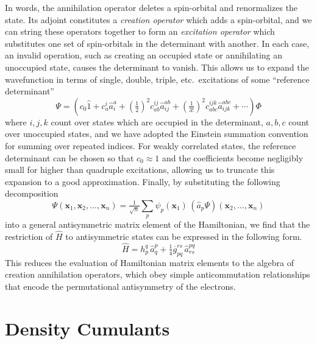 In words, the annihilation operator deletes a spin-orbital and renormalizes the
state.
Its adjoint constitutes a {\itshape creation operator} which adds a
spin-orbital, and we can string these operators together to form an {\itshape
excitation operator} which substitutes one set of spin-orbitals in the
determinant with another.
In each case, an invalid operation, such as creating an occupied state or
annihilating an unoccupied state, causes the determinant to vanish.
This allows us to expand the wavefunction in terms of single, double, triple,
etc.\ excitations of some ``reference determinant''
\begin{equation}
    \label{eq:intro-ci-expansion}
    \Psi
    =
    \left(
        c_0
        \hat{1}
        +
        c_a^i
        \hat{a}^a_i
        +
        (\tfrac{1}{2})^2
        c_{ab}^{ij}
        \hat{a}^{ab}_{ij}
        +
        (\tfrac{1}{3!})^2
        c_{abc}^{ijk}
        \hat{a}^{abc}_{ijk}
        +
        \cdots
    \right)
    \Phi
\end{equation}
where \(i, j, k\) count over states which are occupied in the determinant, \(a,
b, c\) count over unoccupied states, and we have adopted the Einstein summation
convention for summing over repeated indices.
For weakly correlated states, the reference determinant can be chosen so that
\(c_0 \approx 1\) and the coefficients become negligibly small for higher than
quadruple excitations, allowing us to truncate this expansion to a good
approximation.
Finally, by substituting the following decomposition
\begin{equation}
    \Psi(\mathbf{x}_1, \mathbf{x}_2, \ldots, \mathbf{x}_n)
    =
    \tfrac{1}{\sqrt{n}}
    \sum_p
    \psi_p(\mathbf{x}_1)\,
    (\hat{a}_p\Psi)(\mathbf{x}_2, \ldots, \mathbf{x}_n)
\end{equation}
into a general antisymmetric matrix element of the Hamiltonian, we find that the
restriction of \(\hat{H}\) to antisymmetric states can be expressed in the
following form.
\begin{equation}
    \hat{H}
    =
    h_p^q\,
    \hat{a}^p_q
    +
    \tfrac{1}{4}
    \overline{g}_{pq}^{rs}\,
    \hat{a}^{pq}_{rs}
\end{equation}
This reduces the evaluation of Hamiltonian matrix elements to the algebra of
creation annihilation operators, which obey simple anticommutation relationships
that encode the permutational antisymmetry of the electrons.


\section{Density Cumulants}

